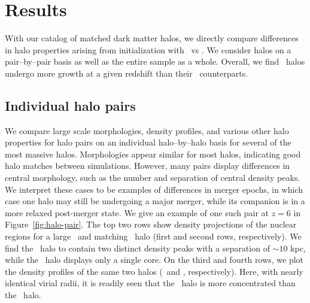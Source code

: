 
%
%

\section{Results}
\label{sec:results}



With our catalog of matched dark matter halos, we directly compare differences in halo properties arising from initialization with \lpt\ vs \za.  We consider halos on a pair--by--pair basis as well as the entire sample as a whole.  Overall, we find \lpt\ halos undergo more growth at a given redshift than their \za\ counterparts.




\subsection{Individual halo pairs}


We compare large scale morphologies, density profiles, and various other halo properties for halo pairs on an individual halo--by--halo basis for several of the most massive halos.  Morphologies appear similar for most halos, indicating good halo matches between simulations.  However, many pairs display differences in central morphology, such as the number and separation of central density peaks.  We interpret these cases to be examples of differences in merger epochs, in which case one halo may still be undergoing a major merger, while its companion is in a more relaxed post-merger state.  We give an example of one such pair at $z = 6$ in Figure~\ref{fig:halo-pair}.  The top two rows show density projections of the nuclear regions for a large \lpt\ and matching \za\ halo (first and second rows, respectively).  We find  the \za\ halo to contain two distinct density peaks with a separation of $\sim 10$ kpc, while the \lpt\ halo displays only a single core.  On the third and fourth rows, we plot the density profiles of the same two halos (\lpt\ and \za, respectively).  Here, with nearly identical virial radii, it is readily seen that the \lpt\ halo is more concentrated than the \za\ halo.




